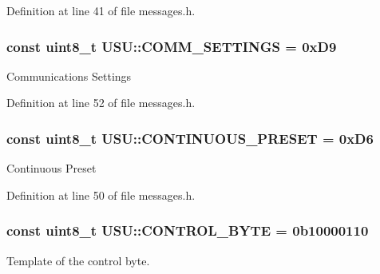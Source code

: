 \-Definition at line 41 of file messages.\-h.

\hypertarget{namespace_u_s_u_a3709ea83b0ef142216dad235ed73a34b}{
\subsubsection[{\-C\-O\-M\-M\-\_\-\-S\-E\-T\-T\-I\-N\-G\-S}]{\setlength{\rightskip}{0pt plus 5cm}const uint8\-\_\-t {\bf \-U\-S\-U\-::\-C\-O\-M\-M\-\_\-\-S\-E\-T\-T\-I\-N\-G\-S} = 0x\-D9}}\label{namespace_u_s_u_a3709ea83b0ef142216dad235ed73a34b}
\-Communications \-Settings 

\-Definition at line 52 of file messages.\-h.

\hypertarget{namespace_u_s_u_a5bc881189e111127f0bd759100dbab6b}{
\subsubsection[{\-C\-O\-N\-T\-I\-N\-U\-O\-U\-S\-\_\-\-P\-R\-E\-S\-E\-T}]{\setlength{\rightskip}{0pt plus 5cm}const uint8\-\_\-t {\bf \-U\-S\-U\-::\-C\-O\-N\-T\-I\-N\-U\-O\-U\-S\-\_\-\-P\-R\-E\-S\-E\-T} = 0x\-D6}}\label{namespace_u_s_u_a5bc881189e111127f0bd759100dbab6b}
\-Continuous \-Preset 

\-Definition at line 50 of file messages.\-h.

\hypertarget{namespace_u_s_u_a2a7d5ce7e6cfea72beb680d46437f83a}{
\subsubsection[{\-C\-O\-N\-T\-R\-O\-L\-\_\-\-B\-Y\-T\-E}]{\setlength{\rightskip}{0pt plus 5cm}const uint8\-\_\-t {\bf \-U\-S\-U\-::\-C\-O\-N\-T\-R\-O\-L\-\_\-\-B\-Y\-T\-E} = 0b10000110}}\label{namespace_u_s_u_a2a7d5ce7e6cfea72beb680d46437f83a}


\-Template of the control byte. 

